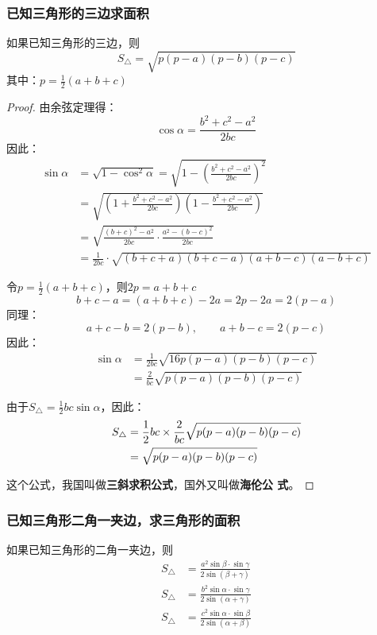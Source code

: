 \subsubsection{已知三角形的三边求面积}

如果已知三角形的三边，则
\[S_{\triangle}=\sqrt{p(p-a)(p-b)(p-c)} \]
其中：$p=\frac{1}{2}(a+b+c)$

\begin{proof}
    由余弦定理得：
\[\cos\alpha=\frac{b^2+c^2-a^2}{2bc}\]
因此：
\[\begin{split}
    \sin\alpha&=\sqrt{1-\cos^2\alpha}=\sqrt{1-\left(\frac{b^2+c^2-a^2}{2bc}\right)^2}\\
    &=\sqrt{\left(1+\frac{b^2+c^2-a^2}{2bc}\right)\left(1-\frac{b^2+c^2-a^2}{2bc}\right)}\\
    &=\sqrt{\frac{(b+c)^2-a^2}{2bc}\cdot \frac{a^2-(b-c)^2}{2bc}}\\
    &=\frac{1}{2bc}\cdot \sqrt{(b+c+a)(b+c-a)(a+b-c)(a-b+c)}
\end{split}\]

令$p=\frac{1}{2}(a+b+c)$，则$2p=a+b+c$
\[b+c-a=(a+b+c)-2a=2p-2a=2(p-a)\]
同理：
\[a+c-b=2(p-b),\qquad a+b-c=2(p-c)\]
因此：
\[\begin{split}
\sin\alpha&=\frac{1}{2bc}\sqrt{16p(p-a)(p-b)(p-c)}\\
&=\frac{2}{bc}\sqrt{p(p-a)(p-b)(p-c)}
\end{split}\]

由于$S_{\triangle}=\frac{1}{2}bc\sin\alpha$，因此：
\[\begin{split}
    S_{\triangle}&=\dfrac{1}{2}bc\times \dfrac{2}{bc}\sqrt{p(p-a)(p-b)(p-c)}\\
    &=\sqrt{p(p-a)(p-b)(p-c)}
\end{split}\]

这个公式，我国叫做\textbf{三斜求积公式}，国外又叫做\textbf{海伦公
式}。
\end{proof}

\subsubsection{已知三角形二角一夹边，求三角形的面积}

如果已知三角形的二角一夹边，则
\[\begin{split}
S_{\triangle}&=\frac{a^{2} \sin \beta \cdot \sin \gamma}{2 \sin (\beta+\gamma)} \\
S_{\triangle}&=\frac{b^{2} \sin \alpha \cdot \sin \gamma}{2 \sin (\alpha+\gamma)} \\
S_{\triangle}&=\frac{c^{2} \sin \alpha \cdot \sin \beta}{2 \sin (\alpha+\beta)}
    \end{split}\]

